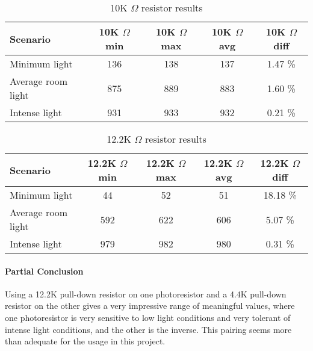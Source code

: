 \begin{table}[H]
  \begin{tabular}{l c c c c}
    Scenario & 10K $\Omega$ min & 10K $\Omega$ max & 10K $\Omega$ avg & 10K $\Omega$ diff \\
    \hline
    Minimum light & 136 & 138 & 137 & 1.47 \% \\
    Average room light & 875 & 889 & 883 & 1.60 \% \\
    Intense light & 931 & 933 & 932 & 0.21 \% \\
  \end{tabular}
  \label{tab:10KTestResults}
  \caption {10K $\Omega$ resistor results}
\end{table}
\begin{table}[H]
  \begin{tabular}{l c c c c}
    Scenario & 12.2K $\Omega$ min & 12.2K $\Omega$ max & 12.2K $\Omega$ avg & 12.2K $\Omega$ diff \\
    \hline
    Minimum light & 44 & 52 & 51 & 18.18 \% \\
    Average room light & 592 & 622 & 606 & 5.07 \% \\
    Intense light & 979 & 982 & 980 & 0.31 \% \\
  \end{tabular}
  \label{tab:12,2KTestResults}
  \caption{12.2K $\Omega$ resistor results}
\end{table}
\paragraph{Partial Conclusion}
Using a 12.2K pull-down resistor on one photoresistor and a 4.4K pull-down resistor on the other gives a very impressive range of meaningful values, where one photoresistor is very sensitive to low light conditions and very tolerant of intense light conditions, and the other is the inverse. This pairing seems more than adequate for the usage in this project.
